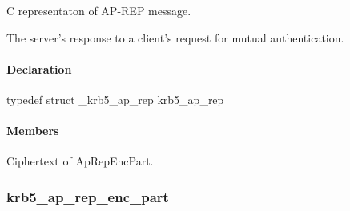 \documentclass[letterpaper,10pt,english]{sphinxmanual}
\begin{document}
\begin{fulllineitems}
\label{appdev/refs/types/krb5_ap_rep:c.krb5_ap_rep}
\end{fulllineitems}


C representaton of AP-REP message.

The server's response to a client's request for mutual authentication.


\paragraph{Declaration}
\label{appdev/refs/types/krb5_ap_rep:declaration}
typedef struct \_krb5\_ap\_rep  krb5\_ap\_rep


\paragraph{Members}
\label{appdev/refs/types/krb5_ap_rep:members}

\begin{fulllineitems}
\label{appdev/refs/types/krb5_ap_rep:c.krb5_ap_rep.magic}
\end{fulllineitems}


\begin{fulllineitems}
\label{appdev/refs/types/krb5_ap_rep:c.krb5_ap_rep.enc_part}
Ciphertext of ApRepEncPart.

\end{fulllineitems}



\subsubsection{krb5\_ap\_rep\_enc\_part}
\label{appdev/refs/types/krb5_ap_rep_enc_part:krb5-ap-rep-enc-part-struct}\label{appdev/refs/types/krb5_ap_rep_enc_part::doc}\label{appdev/refs/types/krb5_ap_rep_enc_part:krb5-ap-rep-enc-part}

\begin{fulllineitems}
\label{appdev/refs/types/krb5_ap_rep_enc_part:c.krb5_ap_rep_enc_part}
\end{fulllineitems}
\end{document}
